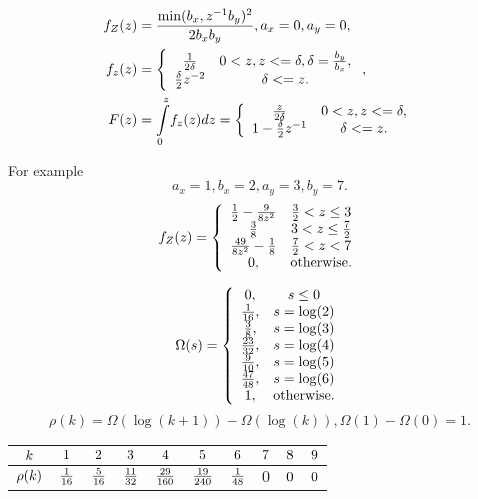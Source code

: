 \documentclass[titlepage,fleqn]{article}%
\begin{document}
\begin{align*}
f_{Z}(z)  &  =\frac{\min(b_{x},z^{-1}b_{y})^{2}}{2b_{x}b_{y}},a_{x}%
=0,a_{y}=0,\\
f_{z}(z)  &  =\left\{
\begin{array}
[c]{cc}%
\frac{1}{2\delta} & 0<z,z<=\delta,\delta=\frac{b_{y}}{b_{x}},\\
\frac{\delta}{2}z^{-2} & \delta<=z.
\end{array}
\right.  ,\\
F(z)  &  =%
{\displaystyle\int\limits_{0}^{z}}
f_{z}(z)dz=\left\{
\begin{array}
[c]{cc}%
\frac{z}{2\delta} & 0<z,z<=\delta,\\
1-\frac{\delta}{2}z^{-1} & \delta<=z.
\end{array}
\right.
\end{align*}


For example%
\[
a_{x}=1,b_{x}=2,a_{y}=3,b_{y}=7.
\]%
\[
f_{Z}(z)=\left\{
\begin{array}
[c]{cc}%
\frac{1}{2}-\frac{9}{8z^{2}} & \frac{3}{2}<z\leq3\\
\frac{3}{8} & 3<z\leq\frac{7}{2}\\
\frac{49}{8z^{2}}-\frac{1}{8} & \frac{7}{2}<z<7\\
0, & \text{otherwise.}%
\end{array}
\right.
\]
%

\[
\Omega(s)=\left\{
\begin{array}
[c]{cc}%
0, & s\leq0\\
\frac{1}{16}, & s=\log(2)\\
\frac{3}{8}, & s=\log(3)\\
\frac{23}{32}, & s=\log(4)\\
\frac{9}{10}, & s=\log(5)\\
\frac{47}{48}, & s=\log(6)\\
1, & \text{otherwise.}%
\end{array}
\right.
\]%
\[
\rho(k)=\Omega(\log(k+1))-\Omega(\log(k)),\Omega(1)-\Omega(0)=1.
\]
%

\begin{tabular}
[c]{|c|c|c|c|c|c|c|c|c|c|}\hline\hline
${\small k}$ & ${\small 1}$ & ${\small 2}$ & ${\small 3}$ & ${\small 4}$ &
${\small 5}$ & ${\small 6}$ & ${\small 7}$ & ${\small 8}$ & ${\small 9}%
$\\\hline
${\small \rho(k)}$ & $\frac{{\small 1}}{16}$ & $\frac{{\small 5}}{16}$ &
$\frac{{\small 11}}{32}$ & $\frac{{\small 29}}{160}$ & $\frac{{\small 19}%
}{240}$ & $\frac{{\small 1}}{48}$ & $0$ & ${\small 0}$ & ${\small 0}%
$\\\hline\hline
\end{tabular}
\end{document}
